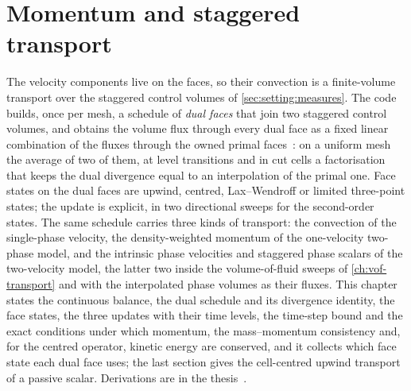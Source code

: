 \chapter{Momentum and staggered transport}\label{ch:momentum-transport}
The velocity components live on the faces, so their convection is a
finite-volume transport over the staggered control volumes of
\cref{sec:setting:measures}. The code builds, once per mesh, a schedule of
\emph{dual faces} that join two staggered control volumes, and obtains the
volume flux through every dual face as a fixed linear combination of the
fluxes through the owned primal faces~: on a uniform mesh
the average of two of them, at level transitions and in cut cells a
factorisation that keeps the dual divergence equal to an interpolation of the
primal one. Face states on the dual faces are upwind, centred,
Lax--Wendroff or limited three-point states; the update is explicit, in
two directional sweeps for the second-order states. The same schedule carries
three kinds of transport: the convection of the single-phase velocity, the
density-weighted momentum of the one-velocity two-phase model, and the
intrinsic phase velocities and staggered phase scalars of the two-velocity
model, the latter two inside the volume-of-fluid sweeps of
\cref{ch:vof-transport} and with the interpolated phase volumes as their
fluxes. This chapter states the continuous balance, the dual schedule and its
divergence identity, the face states, the three updates with their time
levels, the time-step bound and the exact conditions under which momentum,
the mass--momentum consistency and, for the centred operator, kinetic energy
are conserved, and it collects which face state each dual face uses; the last
section gives the cell-centred upwind transport of a passive scalar.
Derivations are in the thesis~.

